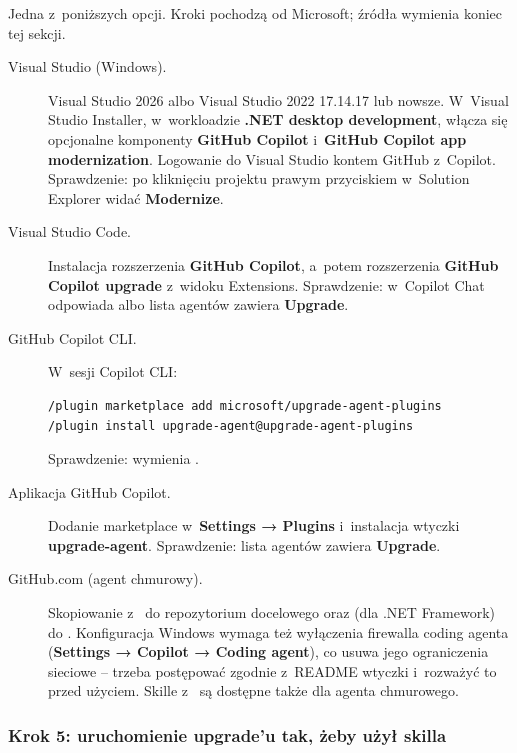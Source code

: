 Jedna z~poniższych opcji. Kroki pochodzą od Microsoft; źródła wymienia koniec tej sekcji.

\begin{description}
  \item[Visual Studio (Windows).] Visual Studio 2026 albo Visual Studio 2022 17.14.17 lub
        nowsze. W~Visual Studio Installer, w~workloadzie \textbf{.NET desktop development},
        włącza się opcjonalne komponenty \textbf{GitHub Copilot} i~\textbf{GitHub Copilot app
        modernization}. Logowanie do Visual Studio kontem GitHub z~Copilot. Sprawdzenie: po
        kliknięciu projektu prawym przyciskiem w~Solution Explorer widać \textbf{Modernize}.
  \item[Visual Studio Code.] Instalacja rozszerzenia \textbf{GitHub Copilot}, a~potem
        rozszerzenia \textbf{GitHub Copilot upgrade} z~widoku Extensions. Sprawdzenie:
        w~Copilot Chat odpowiada  albo lista agentów zawiera
        \textbf{Upgrade}.
  \item[GitHub Copilot CLI.] W~sesji Copilot CLI:
\begin{lstlisting}
/plugin marketplace add microsoft/upgrade-agent-plugins
/plugin install upgrade-agent@upgrade-agent-plugins
\end{lstlisting}
        Sprawdzenie:  wymienia .
  \item[Aplikacja GitHub Copilot.] Dodanie marketplace 
        w~\textbf{Settings → Plugins} i~instalacja wtyczki \textbf{upgrade-agent}.
        Sprawdzenie: lista agentów zawiera \textbf{Upgrade}.
  \item[GitHub.com (agent chmurowy).] Skopiowanie 
        z~ do  repozytorium
        docelowego oraz  (dla .NET
        Framework) do . Konfiguracja Windows
        wymaga też wyłączenia firewalla coding agenta (\textbf{Settings → Copilot → Coding
        agent}), co usuwa jego ograniczenia sieciowe -- trzeba postępować zgodnie z~README
        wtyczki i~rozważyć to przed użyciem. Skille z~ są dostępne także
        dla agenta chmurowego.
\end{description}

\subsubsection{Krok 5: uruchomienie upgrade'u tak, żeby użył skilla}

